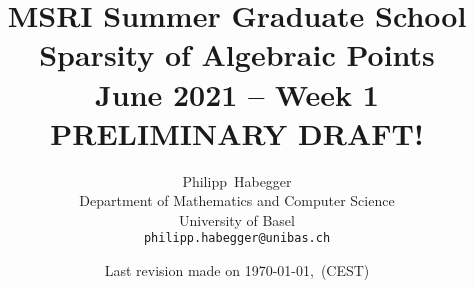 \documentclass[oneside]{scrbook}
\begin{document}
\title{MSRI Summer Graduate School \\ Sparsity of Algebraic Points \\
  June 2021 -- Week 1 \\ PRELIMINARY DRAFT! }
\author{Philipp~Habegger \\ Department of Mathematics and Computer
  Science \\ University of Basel \\ \texttt{philipp.habegger@unibas.ch}}
\date{Last revision made on \today, \currenttime \,(CEST)}



\maketitle
\tableofcontents

\setcounter{chapter}{-1}















\vfill\hfill\texttt{}
\end{document}
